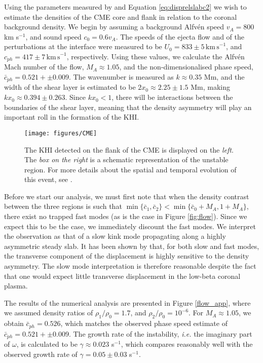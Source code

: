 \documentclass[12pt]{ociamthesis}
\begin{document}
Using the parameters measured by \cite{Foullon2011} and Equation \ref{eq:disprelslabc2} we wish to estimate the densities of the CME core and flank in relation to the coronal background density.
We begin by assuming a background Alfv\'en speed $v_A = 800$ km s$^{-1}$, and sound speed $c_0 = 0.6 v_A$.
The speeds of the ejecta flow and of the perturbations at the interface were measured to be $U_0 = 833 \pm 5 \, \mathrm{km \, s}^{-1}$, and $c_{ph} = 417 \pm 7 \, \mathrm{km \, s}^{-1}$, respectively.
Using these values, we calculate the Alfv\'en Mach number of the flow, $M_A \approx 1.05$, and the non-dimensionalised phase speed, $\bar c_{ph} = 0.521 + \pm 0.009$.
The wavenumber is measured as $k \approx 0.35$ Mm, and the width of the shear layer is estimated to be $2 x_0 \approx 2.25 \pm 1.5$ Mm, making $k x_0 \approx 0.394 \pm 0.263$.
Since $k x_0 < 1$, there will be interactions between the boundaries of the shear layer, meaning that the density asymmetry will play an important roll in the formation of the KHI.

\begin{figure}[!t]
\centering
\texttt{[image: figures/CME]}
\caption{The KHI detected on the flank of the CME is displayed on the \textit{left}. The \textit{box on the right} is a schematic representation of the unstable region. For more details about the spatial and temporal evolution of this event, see \citet{Foullon2011}.}
\label{CME}
\end{figure}

Before we start our analysis, we must first note that when the density contrast between the three regions is such that $\min\{\bar c_1, \bar c_2\} < \min\{\bar c_0 + M_A, 1 + M_A\}$, there exist no trapped fast modes (as is the case in Figure \ref{fig:flow}).
Since we expect this to be the case, we immediately discount the fast modes.
We interpret the observation as that of a slow kink mode propagating along a highly asymmetric steady slab.
It has been shown by \cite{Allcock2017} that, for both slow and fast modes, the transverse component of the displacement is highly sensitive to the density asymmetry.
The slow mode interpretation is therefore reasonable despite the fact that one would expect little transverse displacement in the low-beta coronal plasma.

The results of the numerical analysis are presented in Figure \ref{flow_app}, where we assumed density ratios of $\rho_1/\rho_0 = 1.7$, and $\rho_2/\rho_0 = 10^{-6}$.
For $M_A \approx 1.05$, we obtain $\bar c_{ph} = 0.526$, which matches the observed phase speed estimate of $\bar c_{ph} = 0.521 + \pm 0.009$.
The growth rate of the instability, \textit{i.e.} the imaginary part of $\omega$, is calculated to be $\gamma \approx 0.023$ s$^{-1}$, which compares reasonably well with the observed growth rate of $\gamma = 0.05 \pm 0.03$ s$^{-1}$.
\end{document}
